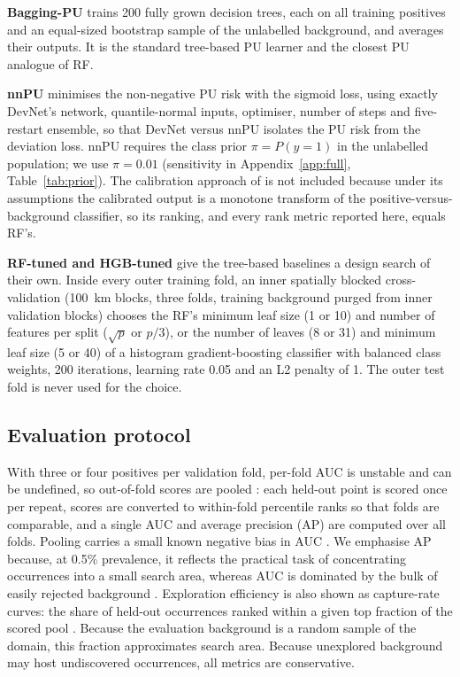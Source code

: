 \documentclass[pdflatex,sn-apa]{sn-jnl}
\begin{document}
\textbf{Bagging-PU} \citep{Mordelet2014} trains 200 fully grown decision trees, each on all training positives and an equal-sized bootstrap sample of the unlabelled background, and averages their outputs. It is the standard tree-based PU learner and the closest PU analogue of RF.

\textbf{nnPU} \citep{Kiryo2017} minimises the non-negative PU risk with the sigmoid loss, using exactly DevNet's network, quantile-normal inputs, optimiser, number of steps and five-restart ensemble, so that DevNet versus nnPU isolates the PU risk from the deviation loss. nnPU requires the class prior $\pi = P(y=1)$ in the unlabelled population; we use $\pi = 0.01$ (sensitivity in Appendix~\ref{app:full}, Table~\ref{tab:prior}). The calibration approach of \citet{Elkan2008} is not included because under its assumptions the calibrated output is a monotone transform of the positive-versus-background classifier, so its ranking, and every rank metric reported here, equals RF's.

\textbf{RF-tuned and HGB-tuned} give the tree-based baselines a design search of their own. Inside every outer training fold, an inner spatially blocked cross-validation (100~km blocks, three folds, training background purged from inner validation blocks) chooses the RF's minimum leaf size (1 or 10) and number of features per split ($\sqrt{p}$ or $p/3$), or the number of leaves (8 or 31) and minimum leaf size (5 or 40) of a histogram gradient-boosting classifier \citep{Pedregosa2011} with balanced class weights, 200 iterations, learning rate 0.05 and an L2 penalty of 1. The outer test fold is never used for the choice.

\subsection{Evaluation protocol}\label{sec:protocol}

With three or four positives per validation fold, per-fold AUC is unstable and can be undefined, so out-of-fold scores are pooled \citep{BradleyAP1997}: each held-out point is scored once per repeat, scores are converted to within-fold percentile ranks so that folds are comparable, and a single AUC and average precision (AP) are computed over all folds. Pooling carries a small known negative bias in AUC \citep{Airola2019,Parker2007}. We emphasise AP because, at 0.5\% prevalence, it reflects the practical task of concentrating occurrences into a small search area, whereas AUC is dominated by the bulk of easily rejected background \citep{Saito2015}. Exploration efficiency is also shown as capture-rate curves: the share of held-out occurrences ranked within a given top fraction of the scored pool \citep{Chung2003,Agterberg2005}. Because the evaluation background is a random sample of the domain, this fraction approximates search area. Because unexplored background may host undiscovered occurrences, all metrics are conservative.
\end{document}
